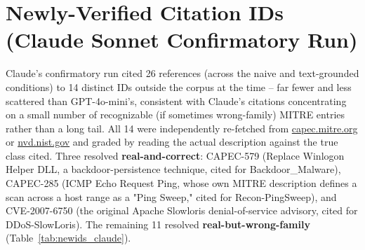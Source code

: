 \documentclass[10pt,twocolumn]{article}
\begin{document}
\section{Newly-Verified Citation IDs (Claude Sonnet Confirmatory Run)}

Claude's confirmatory run cited 26 references (across the naive and text-grounded conditions)
to 14 distinct IDs outside the corpus at the time -- far fewer and less scattered than
GPT-4o-mini's, consistent with Claude's citations concentrating on a small number of recognizable
(if sometimes wrong-family) MITRE entries rather than a long tail. All 14 were independently
re-fetched from \url{capec.mitre.org} or \url{nvd.nist.gov} and graded by reading the actual
description against the true class cited. Three resolved \textbf{real-and-correct}: CAPEC-579
(Replace Winlogon Helper DLL, a backdoor-persistence technique, cited for Backdoor\_Malware),
CAPEC-285 (ICMP Echo Request Ping, whose own MITRE description defines a scan across a host range
as a "Ping Sweep," cited for Recon-PingSweep), and CVE-2007-6750 (the original Apache Slowloris
denial-of-service advisory, cited for DDoS-SlowLoris). The remaining 11 resolved
\textbf{real-but-wrong-family} (Table~\ref{tab:newids_claude}).
\end{document}

